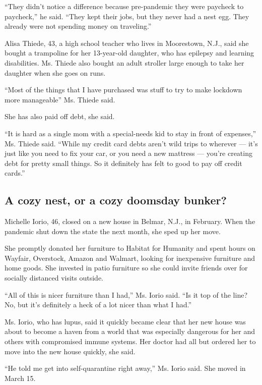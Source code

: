 ``They didn't notice a difference because pre-pandemic they were
paycheck to paycheck,'' he said. ``They kept their jobs, but they never
had a nest egg. They already were not spending money on traveling.''

Alisa Thiede, 43, a high school teacher who lives in Moorestown, N.J.,
said she bought a trampoline for her 13-year-old daughter, who has
epilepsy and learning disabilities. Ms. Thiede also bought an adult
stroller large enough to take her daughter when she goes on runs.

``Most of the things that I have purchased was stuff to try to make
lockdown more manageable'' Ms. Thiede said.

She has also paid off debt, she said.

``It is hard as a single mom with a special-needs kid to stay in front
of expenses,'' Ms. Thiede said. ``While my credit card debts aren't wild
trips to wherever --- it's just like you need to fix your car, or you
need a new mattress --- you're creating debt for pretty small things. So
it definitely has felt to good to pay off credit cards.''

\hypertarget{a-cozy-nest-or-a-cozy-doomsday-bunker}{%
\subsection{A cozy nest, or a cozy doomsday
bunker?}\label{a-cozy-nest-or-a-cozy-doomsday-bunker}}

Michelle Iorio, 46, closed on a new house in Belmar, N.J., in February.
When the pandemic shut down the state the next month, she sped up her
move.

She promptly donated her furniture to Habitat for Humanity and spent
hours on Wayfair, Overstock, Amazon and Walmart, looking for inexpensive
furniture and home goods. She invested in patio furniture so she could
invite friends over for socially distanced visits outside.

``All of this is nicer furniture than I had,'' Ms. Iorio said. ``Is it
top of the line? No, but it's definitely a heck of a lot nicer than what
I had.''

Ms. Iorio, who has lupus, said it quickly became clear that her new
house was about to become a haven from a world that was especially
dangerous for her and others with compromised immune systems. Her doctor
had all but ordered her to move into the new house quickly, she said.

``He told me get into self-quarantine right away,'' Ms. Iorio said. She
moved in March 15.

